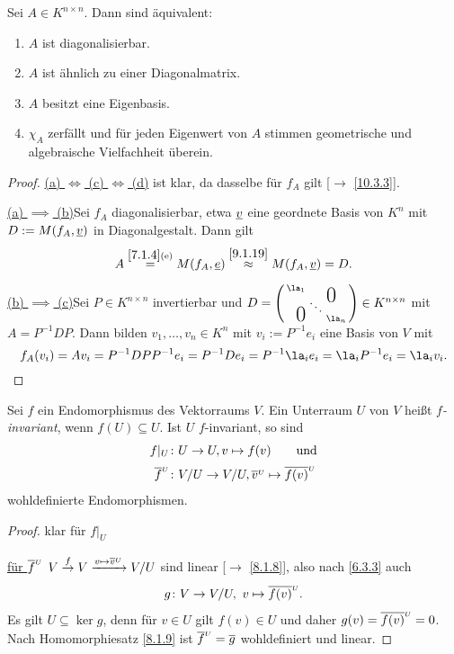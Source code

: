 \documentclass[../../main.tex]{subfiles}
\begin{document}
\begin{sat}\label{10.3.5}
Sei $A\in K^{n\times n}$. Dann sind äquivalent:
\begin{enumerate}[\rm(a)]
\item $A$ ist diagonalisierbar.
\item $A$ ist ähnlich zu einer Diagonalmatrix.
\item $A$ besitzt eine Eigenbasis.
\item $\chi_A$ zerfällt und für jeden Eigenwert von $A$ stimmen geometrische und algebraische Vielfachheit überein.
\end{enumerate}
\end{sat}
\begin{proof}
\underline{(a) $\iff$ (c) $\iff$ (d)} ist klar, da dasselbe für $f_A$ gilt [$\to$ \ref{10.3.3}].

\smallskip
\underline{(a) $\implies$ (b)}\quad Sei $f_A$ diagonalisierbar, etwa ${\underline v}$ eine geordnete Basis von $K^n$ mit $D:=M(f_A, {\underline v})$ in Diagonalgestalt. Dann gilt
$$A\overset{\ref{7.1.4} \text{(e)}}{=} M(f_A, {\underline e}) \overset{\ref{9.1.19}}{\approx} M(f_A, {\underline v}) = D.$$

\underline{(b) $\implies$ (c)}\quad Sei $P\in K^{n\times n}$ invertierbar und $D = \left(\begin{smallmatrix}
\la_1 & & \llap{$\overset{\blap{\LARGE 0}}{~}$} \\
& \ddots &\\
\rlap{\tlap{\LARGE 0}} & & \la_n
\end{smallmatrix}\right)\in K^{n\times n}$ mit $A = P^{-1}D P$. Dann bilden $v_1,\ldots,v_n\in K^n$ mit $v_i := P^{-1}e_i$ eine Basis von $V$ mit
\[f_A(v_i) = Av_i = P^{-1}DPP^{-1}e_i = P^{-1} D e_i = P^{-1}\la_i e_i = \la_i P^{-1}e_i = \la_i v_i.\]
\end{proof}

\begin{pro}\label{10.3.6}
Sei $f$ ein Endomorphismus des Vektorraums $V$. Ein Unterraum $U$ von $V$ heißt \emph{$f$-invariant}, wenn $f(U) \subseteq U$. Ist $U$ $f$-invariant, so sind
\begin{align*}
f|_U\colon&U\to U, v\mapsto f(v)\qquad\text{und}\\
\overline{f}^{\substack{\\\scriptscriptstyle U}}\colon&V/U \to V/U, \overline{v}^{\substack{\\\scriptscriptstyle U}}\mapsto \overline{f(v)}^{\substack{\\\scriptscriptstyle U}}
\end{align*}
wohldefinierte Endomorphismen.
\end{pro}
\begin{proof}
klar für $f|_U$

\underline{für $\overline{f}^{\substack{\\\scriptscriptstyle U}}$}\quad
$V\overset f\to V\xrightarrow{v\mapsto\overline{v}^{\substack{\\\scriptscriptstyle U}}} V/U$ sind linear [$\to$ \ref{8.1.8}], also nach \ref{6.3.3} auch
\[g\colon V\to V/U,\ v\mapsto\overline{f(v)}^{\substack{\\\scriptscriptstyle U}}.\] Es gilt $U\subseteq \ker g$, denn für $v\in U$ gilt $f(v)\in U$ und daher $g(v) = \overline{f(v)}^{\substack{\\\scriptscriptstyle U}} = 0$. Nach Homomorphiesatz \ref{8.1.9} ist $\overline{f}^{\substack{\\\scriptscriptstyle U}} = \overline{g}$ wohldefiniert und linear.
\end{proof}
\end{document}
